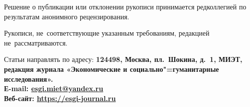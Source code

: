 \begin{multicols}{2}
Решение о публикации или отклонении рукописи принимается редколлегией
по результатам анонимного рецензирования.

Рукописи, не~соответствующие указанным требованиям, редакцией не~рассматриваются.

\begin{flushleft}
    Статьи направлять по адресу: \bfseries 124498,
    Москва, пл. Шокина, д. 1, МИЭТ,
    редакция журнала «Экономические
    и социально"=гуманитарные исследования».\\
    Е-mail: \href{mailto:esgi.miet@yandex.ru}{esgi.miet@yandex.ru}\\
Веб-сайт: \url{https://esgi-journal.ru}    \par
\end{flushleft}

\end{multicols}

\setmainlinespread

\label{authors:end}
